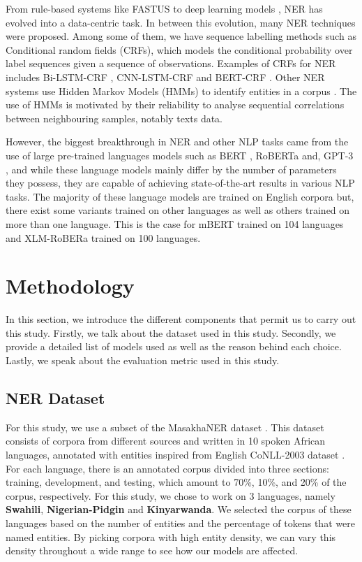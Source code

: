 \documentclass{article}
\begin{document}
From rule-based systems like FASTUS \cite{appelt-etal-1995-sri} to deep learning models \cite{abs-1812-09449}, NER has evolved into a data-centric task. In between this evolution, many NER techniques were proposed. Among some of them, we have sequence labelling methods such as Conditional random fields (CRFs), which models the conditional probability over label sequences given a sequence of observations. Examples of CRFs for NER includes Bi-LSTM-CRF \cite{HuangXY15}, CNN-LSTM-CRF \cite{abs-1905-01964} and BERT-CRF \cite{abs-1909-10649}. Other NER systems use Hidden Markov Models (HMMs) to identify entities in a corpus \cite{10.1007/978-3-540-77046-6_67}. The use of HMMs is motivated by their reliability to analyse sequential correlations between neighbouring samples, notably texts data.

However, the biggest breakthrough in NER and other NLP tasks came from the use of large pre-trained languages models such as BERT  \cite{abs-1810-04805}, RoBERTa \cite{abs-1907-11692} and, GPT-3 \cite{abs-2005-14165}, and while these language models mainly differ by the number of parameters they possess, they are capable of achieving state-of-the-art results in various NLP tasks. The majority of these language models are trained on English corpora but, there exist some variants trained on other languages \cite{abs-1911-03894,abs-2012-02110,CaneteCFP2020} as well as others trained on more than one language. This is the case for mBERT \cite{abs-1911-03310} trained on 104 languages and XLM-RoBERa \cite{abs-1901-07291} trained on 100 languages.

\section{Methodology}
\label{sec:met}

In this section, we introduce the different components that permit us to carry out this study. Firstly, we talk about the dataset used in this study. Secondly, we provide a detailed list of models used as well as the reason behind each choice. Lastly, we speak about the evaluation metric used in this study.

\subsection{NER Dataset}

For this study, we use a subset of the MasakhaNER dataset \cite{10.1162/tacl_a_00416}. This dataset consists of corpora from different sources and written in 10 spoken African languages, annotated with entities inspired from English CoNLL-2003 dataset \cite{tjong-kim-sang-2002-introduction}. For each language, there is an annotated corpus divided into three sections: training, development, and testing, which amount to 70\%, 10\%, and 20\% of the corpus, respectively. For this study, we chose to work on 3 languages, namely \textbf{Swahili}, \textbf{Nigerian-Pidgin} and \textbf{Kinyarwanda}. We selected the corpus of these languages based on the number of entities and the percentage of tokens that were named entities. By picking corpora with high entity density, we can vary this density throughout a wide range to see how our models are affected.
\end{document}
